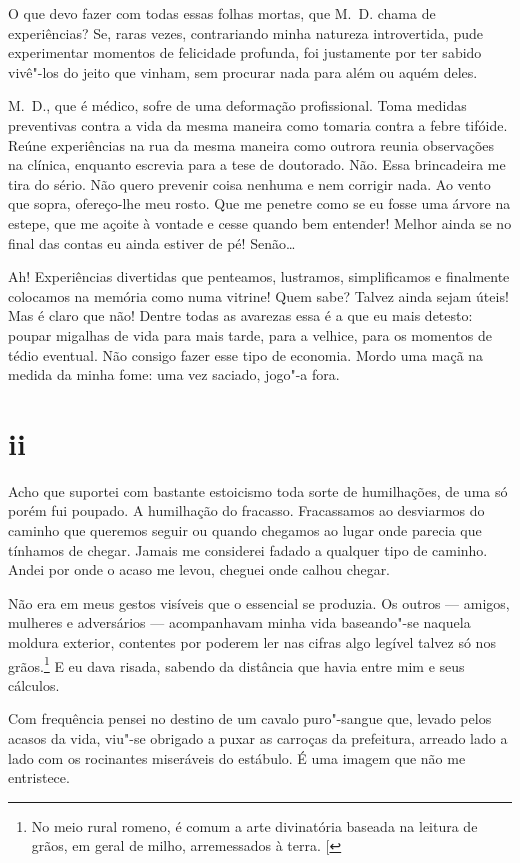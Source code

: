 O que devo fazer com todas essas folhas mortas, que M.~D. chama de
experiências? Se, raras vezes, contrariando minha natureza
introvertida, pude experimentar momentos de felicidade profunda, foi
justamente por ter sabido vivê"-los do jeito que vinham, sem procurar
nada para além ou aquém deles.

M.~D., que é médico, sofre de uma deformação profissional. Toma medidas
preventivas contra a vida da mesma maneira como tomaria contra a febre
tifóide. Reúne experiências na rua da mesma maneira como outrora reunia
observações na clínica, enquanto escrevia para a tese de doutorado. Não.
Essa brincadeira me tira do sério. Não quero prevenir coisa nenhuma e
nem corrigir nada. Ao vento que sopra, ofereço-lhe meu rosto.
Que me penetre como se eu fosse uma árvore na estepe, que me açoite à
vontade e cesse quando bem entender! Melhor ainda se no final das
contas eu ainda estiver de pé! Senão\ldots{}

Ah! Experiências divertidas que penteamos, lustramos, simplificamos e
finalmente colocamos na memória como numa vitrine! Quem sabe? Talvez
ainda sejam úteis! Mas é claro que não! Dentre
todas as avarezas essa é a que eu mais detesto: poupar migalhas de vida
para mais tarde, para a velhice, para os momentos de tédio eventual. Não
consigo fazer esse tipo de economia. Mordo uma maçã na medida da minha
fome: uma vez saciado, jogo"-a fora.

\section{ii}

Acho que suportei com bastante estoicismo toda sorte de humilhações, de
uma só porém fui poupado. A humilhação do fracasso. Fracassamos ao
desviarmos do caminho que queremos seguir ou quando chegamos ao lugar
onde parecia que tínhamos de chegar. Jamais me considerei
fadado a qualquer tipo de caminho. Andei por onde o acaso me levou,
cheguei onde calhou chegar.

Não era em meus gestos visíveis que o essencial se produzia. Os outros ---
amigos, mulheres e adversários --- acompanhavam minha vida baseando"-se
naquela moldura exterior, contentes por poderem ler nas cifras algo
legível talvez só nos grãos.\footnote{No meio
rural romeno, é comum a arte divinatória baseada na leitura de grãos, em
geral de milho, arremessados à terra. {[}\versal{N.~T.}{]}} E eu dava risada, sabendo da distância
que havia entre mim e seus cálculos.

Com frequência pensei no destino de um cavalo puro"-sangue que,
levado pelos acasos da vida, viu"-se obrigado a puxar as carroças da
prefeitura, arreado lado a lado com os rocinantes miseráveis do
estábulo. É uma imagem que não me entristece.

